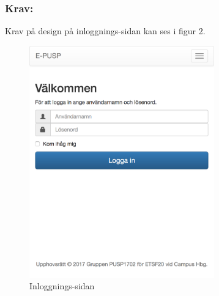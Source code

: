 \documentclass[paper=a4, fontsize=11pt,twoside]{article}
\begin{document}
\subsubsection{Krav:} Krav på design på inloggnings-sidan kan ses i figur 2.
\begin{figure}[H]
\centering
\includegraphics[width=8cm]{login}
\caption{Inloggnings-sidan}
\end{figure}

\newpage
\end{document}
